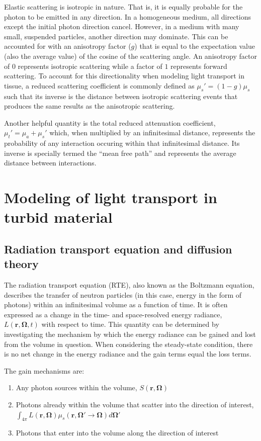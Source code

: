 Elastic scattering is isotropic in nature. That is, it is equally probable for the photon to be emitted in any direction. In a homogeneous medium, all directions except the initial photon direction cancel. However, in a medium with many small, suspended particles, another direction may dominate. This can be accounted for with an anisotropy factor ($g$) that is equal to the expectation value (also the average value) of the cosine of the scattering angle. An anisotropy factor of $0$ represents isotropic scattering while a factor of $1$ represents forward scattering. To account for this directionality when modeling light transport in tissue, a reduced scattering coefficient is commonly defined as $\mu_s'=(1-g)\mu_s$ such that its inverse is the distance between isotropic scattering events that produces the same results as the anisotropic scattering.\cite{Gratton2004}

Another helpful quantity is the total reduced attenuation coefficient, $\mu_t'=\mu_a + \mu_s'$ which, when multiplied by an infinitesimal distance, represents the probability of any interaction occuring within that infinitesimal distance. Its inverse is specially termed the ``mean free path'' and represents the average distance between interactions.\cite{Farrell2003}

\section{Modeling of light transport in turbid material}

\subsection{Radiation transport equation and diffusion theory}
The radiation transport equation (RTE), also known as the Boltzmann equation, describes the transfer of neutron particles (in this case, energy in the form of photons) within an infinitesimal volume as a function of time.\cite{Duderstadt1976} It is often expressed as a change in the time- and space-resolved energy radiance, $L(\mathbf{r},\mathbf{\Omega},t)$ with respect to time. This quantity can be determined by investigating the mechanism by which the energy radiance can be gained and lost from the volume in question. When considering the steady-state condition, there is no net change in the energy radiance and the gain terms equal the loss terms.

\noindent The gain mechanisms are:
\begin{enumerate}
	\item Any photon sources within the volume, $ S(\mathbf{r},\mathbf{\Omega}) $
	\item Photons already within the volume that scatter into the direction of interest,  $\int_{4\pi} L(\mathbf{r},\mathbf{\Omega}) \mu_s(\mathbf{r},\mathbf{\Omega}' \rightarrow \mathbf{\Omega}) d \mathbf{\Omega'} $
	\item Photons that enter into the volume along the direction of interest
\end{enumerate}

